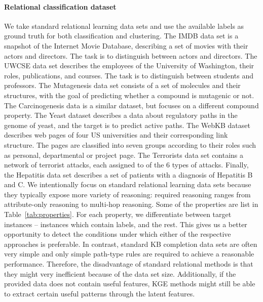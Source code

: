 \paragraph{Relational classification dataset}
We take standard relational learning data sets and use the available labels as ground truth for both classification and clustering.
The IMDB data set is a snapshot of the Internet Movie Database, describing a set of movies with their actors and directors.
The task is to distinguish between actors and directors.
The UWCSE data set describes the employees of the University of Washington, their roles, publications, and courses.
The task is to distinguish between students and professors.
The Mutagenesis data set consists of a set of molecules and their structures, with the goal of predicting whether a compound is mutagenic or not.
The Carcinogenesis data is a similar dataset, but focuses on a different compound property.
The Yeast dataset describes a data about regulatory paths in the genome of yeast, and the target is to predict active paths.
The WebKB dataset describes web pages of four US universities and their corresponding link structure.
The pages are classified into seven groups according to their roles such as personal, departmental or project page.
The Terrorists data set contains a network of terrorist attacks, each assigned to of the 6 types of attacks.
Finally, the Hepatitis data set describes a set of patients with a diagnosis of Hepatitis B and C.
We intentionally focus on standard relational learning data sets because they typically expose more variety of reasoning: required reasoning ranges from attribute-only reasoning to multi-hop reasoning.
Some of the properties are list in Table~\ref{tab:properties}.
For each property, we differentiate between target instances -- instances which contain labels, and the rest.
This gives us a better opportunity to detect the conditions under which either of the respective approaches is preferable.
In contrast, standard KB completion data sets are often very simple and  only simple path-type rules are required to achieve a reasonable performance.
Therefore, the disadvantage of standard relational methods is that they might very inefficient because of the data set size.
Additionally, if the provided data does not contain useful features, KGE methods might still be able to extract certain useful patterns through the latent features.



